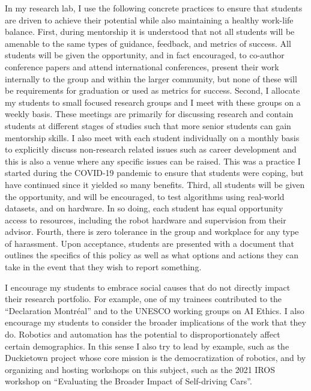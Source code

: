 \documentclass[english,
]{nserc-alliance}
\begin{document}
In my research lab, I use  the following concrete practices to ensure that students are driven to achieve their potential while also maintaining a healthy work-life balance.
First, during mentorship it is understood that not all students will be amenable to the same types of guidance, feedback, and metrics of success.
All students will be given the opportunity, and in fact encouraged, to co-author conference papers and attend international conferences, present their work internally to the group and within the larger community, but none of these will be requirements for graduation or used as metrics for success.
Second, I allocate my students to small focused research groups and I meet with these groups on a weekly basis.
These meetings are primarily for discussing research and contain students at different stages of studies such that more senior students can gain mentorship skills.
I also meet with each student individually on a monthly basis to explicitly discuss non-research related issues such as career development and this is also a venue where any specific issues can be raised. This was a practice I started during the COVID-19 pandemic to ensure that students were coping, but have continued since it yielded so many benefits. 
Third, all students will be given the opportunity, and will be encouraged, to test algorithms using real-world datasets, and on hardware.
In so doing, each student has equal opportunity access to resources, including the robot hardware and supervision from their advisor.
Fourth, there is zero tolerance in the group and workplace for any type of harassment. Upon acceptance, students are presented with a document that outlines the specifics of this policy as well as what options and actions they can take in the event that they wish to report something.


I encourage my students to embrace social causes that do not directly impact their research portfolio. For example, one of my trainees contributed to the ``Declaration Montréal'' and to the UNESCO working groups on AI Ethics.
I also encourage my students to consider the broader implications of the work that they do. Robotics and automation has the potential to disproportionately affect certain demographics. In this sense I also try to lead by example, such as the Duckietown project whose core mission is the democratization of robotics, and by organizing and hosting workshops on this subject, such as the 2021 IROS workshop on ``Evaluating the Broader Impact of Self-driving Cars''. 
\end{document}
